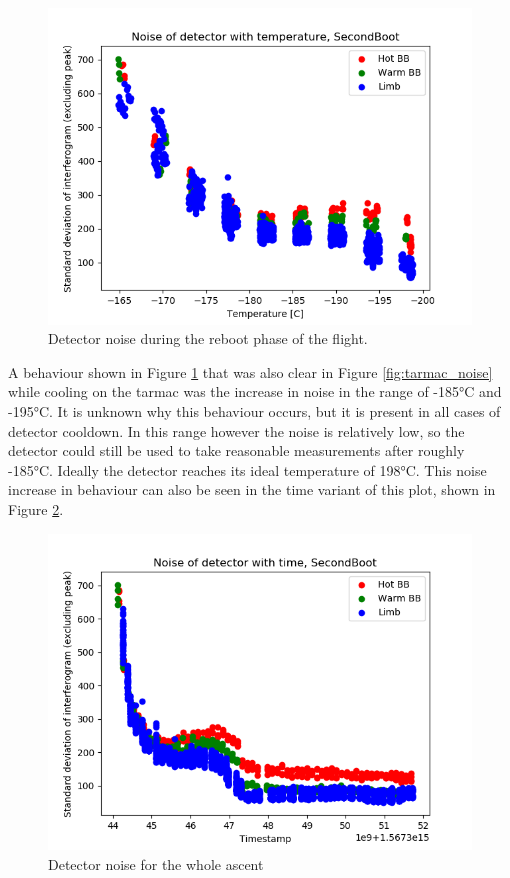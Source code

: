 \begin{figure}[ht]
\centering
  \includegraphics[width=0.8\linewidth]{mct_noise_temp_plots/SecondBoot_noisevtemp_invertedx_colours.png}
  \caption{Detector noise during the reboot phase of the flight.}
  \label{fig:secondboot_noise}
\end{figure}

A behaviour shown in Figure \ref{fig:secondboot_noise} that was also clear in Figure \ref{fig:tarmac_noise} while cooling on the tarmac was the increase in noise in the range of -185°C and -195°C. It is unknown why this behaviour occurs, but it is present in all cases of detector cooldown. In this range however the noise is relatively low, so the detector could still be used to take reasonable measurements after roughly -185°C. Ideally the detector reaches its ideal temperature of 198°C. This noise increase in behaviour can also be seen in the time variant of this plot, shown in Figure \ref{fig:secondboot_noisetime}.

\begin{figure}[ht]
\centering
  \includegraphics[width=0.8\linewidth]{mct_noise_temp_plots/SecondBoot_full_noisevtime_colours.png}
  \caption{Detector noise for the whole ascent}
  \label{fig:secondboot_noisetime}
\end{figure}

